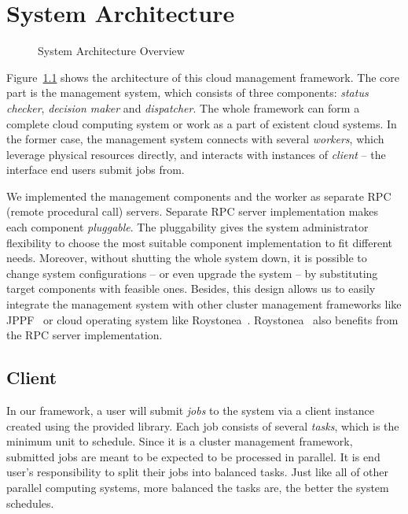 \chapter{System Architecture}

\begin{figure}
  \centering
  
  \caption{System Architecture Overview}
  \label{fig:archi-overview}
\end{figure}

Figure~\ref{fig:archi-overview} shows the architecture of this cloud
management framework.  The core part is the management system, which
consists of three components: \emph{status checker}, \emph{decision
maker} and \emph{dispatcher}.  The whole framework can form a complete
cloud computing system or work as a part of existent cloud systems.  In
the former case, the management system connects with several
\emph{workers}, which leverage physical resources directly, and
interacts with instances of \emph{client} -- the interface end users
submit jobs from.

We implemented the management components and the worker as separate RPC
(remote procedural call) servers.  Separate RPC server implementation
makes each component \emph{pluggable}.  The pluggability gives the
system administrator flexibility to choose the most suitable component
implementation to fit different needs.  Moreover, without shutting the
whole system down, it is possible to change system configurations -- or
even upgrade the system -- by substituting target components with
feasible ones.  Besides, this design allows us to easily integrate the
management system with other cluster management frameworks like
JPPF~\cite{cite:JPPF} or cloud operating system like
Roystonea~\cite{cite:roystonea}.  Roystonea~\cite{cite:roystonea} also
benefits from the RPC server implementation.

\section{Client}

In our framework, a user will submit \emph{jobs} to the system via a
client instance created using the provided library.  Each job consists
of several \emph{tasks}, which is the minimum unit to schedule.  Since
it is a cluster management framework, submitted jobs are meant to be
expected to be processed in parallel. It is end user's responsibility to
split their jobs into balanced tasks.  Just like all of other parallel
computing systems, more balanced the tasks are, the better the system
schedules.

